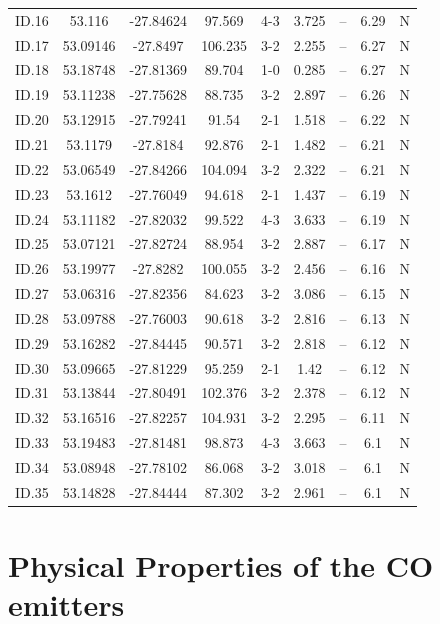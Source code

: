 \begin{table}[!htbp]
\begin{tabular}{ccccccccc}
ID.16 & 53.116 & -27.84624 & 97.569 & 4-3 & 3.725 & -- & 6.29 & N \\
ID.17 & 53.09146 & -27.8497 & 106.235 & 3-2 & 2.255 & -- & 6.27 & N \\
ID.18 & 53.18748 & -27.81369 & 89.704 & 1-0 & 0.285 & -- & 6.27 & N \\
ID.19 & 53.11238 & -27.75628 & 88.735 & 3-2 & 2.897 & -- & 6.26 & N \\
ID.20 & 53.12915 & -27.79241 & 91.54 & 2-1 & 1.518 & -- & 6.22 & N \\
ID.21 & 53.1179 & -27.8184 & 92.876 & 2-1 & 1.482 & -- & 6.21 & N \\
ID.22 & 53.06549 & -27.84266 & 104.094 & 3-2 & 2.322 & -- & 6.21 & N \\
ID.23 & 53.1612 & -27.76049 & 94.618 & 2-1 & 1.437 & -- & 6.19 & N \\
ID.24 & 53.11182 & -27.82032 & 99.522 & 4-3 & 3.633 & -- & 6.19 & N \\
ID.25 & 53.07121 & -27.82724 & 88.954 & 3-2 & 2.887 & -- & 6.17 & N \\
ID.26 & 53.19977 & -27.8282 & 100.055 & 3-2 & 2.456 & -- & 6.16 & N \\
ID.27 & 53.06316 & -27.82356 & 84.623 & 3-2 & 3.086 & -- & 6.15 & N \\
ID.28 & 53.09788 & -27.76003 & 90.618 & 3-2 & 2.816 & -- & 6.13 & N \\
ID.29 & 53.16282 & -27.84445 & 90.571 & 3-2 & 2.818 & -- & 6.12 & N \\
ID.30 & 53.09665 & -27.81229 & 95.259 & 2-1 & 1.42 & -- & 6.12 & N \\
ID.31 & 53.13844 & -27.80491 & 102.376 & 3-2 & 2.378 & -- & 6.12 & N \\
ID.32 & 53.16516 & -27.82257 & 104.931 & 3-2 & 2.295 & -- & 6.11 & N \\
ID.33 & 53.19483 & -27.81481 & 98.873 & 4-3 & 3.663 & -- & 6.1 & N \\
ID.34 & 53.08948 & -27.78102 & 86.068 & 3-2 & 3.018 & -- & 6.1 & N \\
ID.35 & 53.14828 & -27.84444 & 87.302 & 3-2 & 2.961 & -- & 6.1 & N \\
\end{tabular}
\end{table}\label{table:Catalog}

\section{Physical Properties of the CO emitters}

